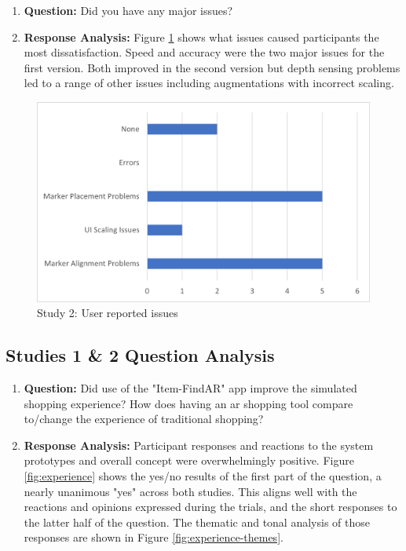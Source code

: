 \documentclass[thesis]{fputhesis}
\begin{document}
\begin{body}
\begin{enumerate}
    \item[] \textbf{Question: } Did you have any major issues?
    \item[] \textbf{Response Analysis: }  Figure \ref{fig:major-issues} shows what issues caused participants the most dissatisfaction. Speed and accuracy were the two major issues for the first version. Both improved in the second version but depth sensing problems led to a range of other issues including augmentations with incorrect scaling.
\end{enumerate}

\begin{figure}[h]
    \centering
    \includegraphics[width=.75\textwidth]{Images/major-issues.png}
    \caption{Study 2: User reported issues}
    \label{fig:major-issues}
\end{figure}

\filbreak
\subsection{Studies 1 \& 2 Question Analysis}
\begin{enumerate}
    \item[] \textbf{Question: } Did use of the "Item-FindAR" app improve the simulated shopping experience? How does having an \acrshort{ar} shopping tool compare to/change the experience of traditional shopping?
    \item[] \textbf{Response Analysis: } Participant responses and reactions to the system prototypes and overall concept were overwhelmingly positive. Figure \ref{fig:experience} shows the yes/no results of the first part of the question, a nearly unanimous "yes" across both studies. This aligns well with the reactions and opinions expressed during the trials, and the short responses to the latter half of the question. The thematic and tonal analysis of those responses are shown in Figure \ref{fig:experience-themes}.
\end{enumerate}


\end{body}
\end{document}
